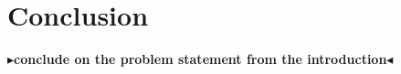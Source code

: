 \documentclass[twoside,11pt,openright]{report}
\newcommand{\todo}[1]{{\color[rgb]{.5,0,0}\textbf{$\blacktriangleright$#1$\blacktriangleleft$}}}
\begin{document}












\chapter{Conclusion}
\label{ch:conclusion}

\todo{conclude on the problem statement from the introduction}


\cleardoublepage
{}
 



\cleardoublepage
\appendix

\end{document}
